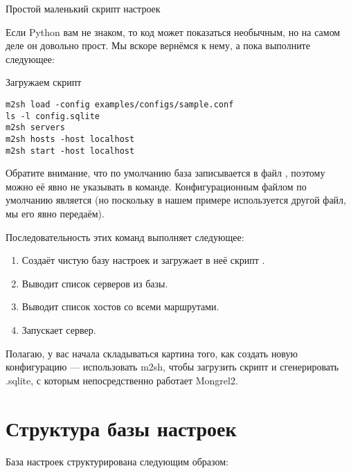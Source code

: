 \begin{code}{Простой маленький скрипт настроек}
  
\end{code}

Если Python вам не знаком, то код может показаться необычным, но на
самом деле он довольно прост. Мы вскоре вернёмся к нему, а пока
выполните следующее:

\begin{code}{Загружаем скрипт}
\begin{lstlisting}
m2sh load -config examples/configs/sample.conf
ls -l config.sqlite
m2sh servers
m2sh hosts -host localhost
m2sh start -host localhost
\end{lstlisting}
\end{code}

Обратите внимание, что по умолчанию база записывается в файл
, поэтому можно её явно не указывать в команде.
Конфигурационным файлом по умолчанию является  (но
поскольку в нашем примере используется другой файл, мы его явно
передаём).

Последовательность этих команд выполняет следующее:

\begin{enumerate}
\item Создаёт чистую базу настроек  и загружает
в неё скрипт .
\item Выводит список серверов из базы.
\item Выводит список хостов со всеми маршрутами.
\item Запускает сервер.
\end{enumerate}

Полагаю, у вас начала складываться картина того, как создать новую
конфигурацию --- использовать m2sh, чтобы загрузить скрипт и
сгенерировать .sqlite, с которым непосредственно работает Mongrel2.

\section{Структура базы настроек}

База настроек структурирована следующим образом:

